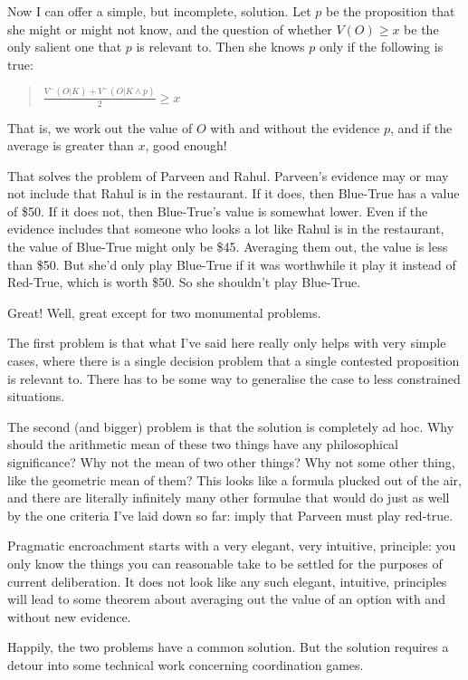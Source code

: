\documentclass[11pt,]{book}
\begin{document}
Now I can offer a simple, but incomplete, solution. Let \(p\) be the proposition that she might or might not know, and the question of whether \(V(O) \geq x\) be the only salient one that \(p\) is relevant to. Then she knows \(p\) only if the following is true:

\begin{quote}
\(\frac{V^-(O | K) + V^-(O | K \wedge p)}{2} \geq x\)
\end{quote}

That is, we work out the value of \(O\) with and without the evidence \(p\), and if the average is greater than \(x\), good enough!

That solves the problem of Parveen and Rahul. Parveen's evidence may or may not include that Rahul is in the restaurant. If it does, then Blue-True has a value of \$50. If it does not, then Blue-True's value is somewhat lower. Even if the evidence includes that someone who looks a lot like Rahul is in the restaurant, the value of Blue-True might only be \$45. Averaging them out, the value is less than \$50. But she'd only play Blue-True if it was worthwhile it play it instead of Red-True, which is worth \$50. So she shouldn't play Blue-True.

Great! Well, great except for two monumental problems.

The first problem is that what I've said here really only helps with very simple cases, where there is a single decision problem that a single contested proposition is relevant to. There has to be some way to generalise the case to less constrained situations.

The second (and bigger) problem is that the solution is completely ad hoc. Why should the arithmetic mean of these two things have any philosophical significance? Why not the mean of two other things? Why not some other thing, like the geometric mean of them? This looks like a formula plucked out of the air, and there are literally infinitely many other formulae that would do just as well by the one criteria I've laid down so far: imply that Parveen must play red-true.

Pragmatic encroachment starts with a very elegant, very intuitive, principle: you
only know the things you can reasonable take to be settled for the purposes of current deliberation. It does not look like any such elegant, intuitive, principles will lead to some theorem about averaging out the value of an option with and without new evidence.

Happily, the two problems have a common solution. But the solution requires a detour into some technical work concerning coordination games.
\end{document}
